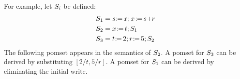 For example, let $S_i$ be defined:
\begin{align*}
  \aCmd_1&=\PR{x}{s}\SEMI\PW{x}{s{+}r}
  \\  
  \aCmd_2&=\PW{x}{t}\SEMI\aCmd_1
  \\  
  \aCmd_3&=\LET{t}{2}\SEMI\LET{r}{5}\SEMI\aCmd_2
\end{align*}
The following pomset appears in the semantics of $S_2$.  A pomset for
$S_3$ can be derived by substituting $[2/t,\allowbreak5/r]$.  A pomset
for $S_1$ can be derived by eliminating the initial write.
